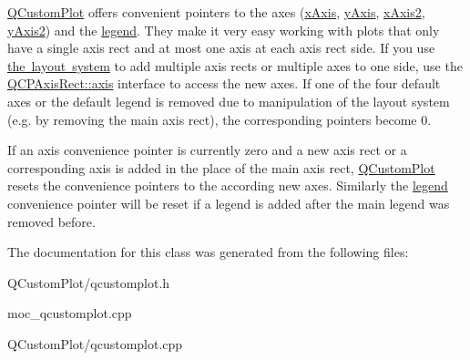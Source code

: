 \mbox{\hyperlink{class_q_custom_plot}{Q\+Custom\+Plot}} offers convenient pointers to the axes (\mbox{\hyperlink{class_q_custom_plot_a9a79cd0158a4c7f30cbc702f0fd800e4}{x\+Axis}}, \mbox{\hyperlink{class_q_custom_plot_af6fea5679725b152c14facd920b19367}{y\+Axis}}, \mbox{\hyperlink{class_q_custom_plot_ada41599f22cad901c030f3dcbdd82fd9}{x\+Axis2}}, \mbox{\hyperlink{class_q_custom_plot_af13fdc5bce7d0fabd640f13ba805c0b7}{y\+Axis2}}) and the \mbox{\hyperlink{class_q_custom_plot_a4eadcd237dc6a09938b68b16877fa6af}{legend}}. They make it very easy working with plots that only have a single axis rect and at most one axis at each axis rect side. If you use \mbox{\hyperlink{}{the layout system}} to add multiple axis rects or multiple axes to one side, use the \mbox{\hyperlink{class_q_c_p_axis_rect_a583ae4f6d78b601b732183f6cabecbe1}{Q\+C\+P\+Axis\+Rect\+::axis}} interface to access the new axes. If one of the four default axes or the default legend is removed due to manipulation of the layout system (e.\+g. by removing the main axis rect), the corresponding pointers become 0.

If an axis convenience pointer is currently zero and a new axis rect or a corresponding axis is added in the place of the main axis rect, \mbox{\hyperlink{class_q_custom_plot}{Q\+Custom\+Plot}} resets the convenience pointers to the according new axes. Similarly the \mbox{\hyperlink{class_q_custom_plot_a4eadcd237dc6a09938b68b16877fa6af}{legend}} convenience pointer will be reset if a legend is added after the main legend was removed before. 

The documentation for this class was generated from the following files\+:\begin{DoxyCompactItemize}
\item 
Q\+Custom\+Plot/qcustomplot.\+h\item 
moc\+\_\+qcustomplot.\+cpp\item 
Q\+Custom\+Plot/qcustomplot.\+cpp\end{DoxyCompactItemize}
